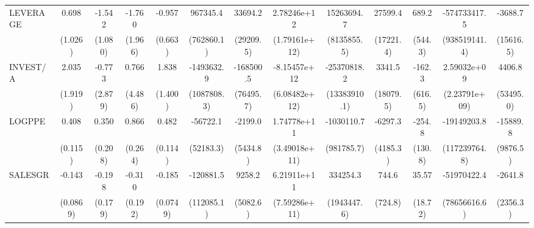 \begin{table}[htbp]
\begin{tabular}{l*{12}{c}}
LEVERAGE            &       0.698         &      -1.542         &      -1.760         &      -0.957         &    967345.4         &     33694.2         & 2.78246e+12         &  15263694.7\sym{*}  &     27599.4         &       689.2         &-574733417.5         &     -3688.7         \\
                    &     (1.026)         &     (1.080)         &     (1.966)         &     (0.663)         &  (762860.1)         &   (29209.5)         &(1.79161e+12)         & (8135855.5)         &   (17221.4)         &     (544.3)         &(938519141.4)         &   (15616.5)         \\
INVEST/A            &       2.035         &      -0.773         &       0.766         &       1.838         &  -1493632.9         &   -168500.5\sym{**} &-8.15457e+12         & -25370818.2\sym{*}  &      3341.5         &      -162.3         & 2.59032e+09         &      4406.8         \\
                    &     (1.919)         &     (2.879)         &     (4.486)         &     (1.400)         & (1087808.3)         &   (76495.7)         &(6.08482e+12)         &(13383910.1)         &   (18079.5)         &     (616.5)         &(2.23791e+09)         &   (53495.0)         \\
LOGPPE              &       0.408\sym{***}&       0.350         &       0.866\sym{***}&       0.482\sym{***}&    -56722.1         &     -2199.0         & 1.74778e+11         &  -1030110.7         &     -6297.3         &      -254.8\sym{*}  & -19149203.8         &    -15889.8         \\
                    &     (0.115)         &     (0.208)         &     (0.264)         &     (0.114)         &   (52183.3)         &    (5434.8)         &(3.49018e+11)         &  (981785.7)         &    (4185.3)         &     (130.8)         &(117239764.8)         &    (9876.5)         \\
SALESGR             &      -0.143         &      -0.198         &      -0.310         &      -0.185\sym{**} &   -120881.5         &      9258.2\sym{*}  & 6.21911e+11         &    334254.3         &       744.6         &       35.57\sym{*}  & -51970422.4         &     -2641.8         \\
                    &    (0.0869)         &     (0.179)         &     (0.192)         &    (0.0749)         &  (112085.1)         &    (5082.6)         &(7.59286e+11)         & (1943447.6)         &     (724.8)         &     (18.72)         &(78656616.6)         &    (2356.3)         \\

\end{tabular}
\end{table}
